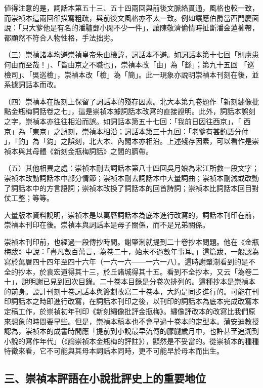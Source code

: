 値得注意的是，詞話本第五十三、五十四兩回與前後文脈絡貫通，風格也較一致，而崇禎本這兩回卻描寫粗疏，與前後文風格亦不太一致。例如讓應伯爵當西門慶面說：「只大爹他是有名的潘驢鄧小閑不少一件」，讓陳敬濟偷情時扯斷潘金蓮褲帶，都顯然不符合人物性格，手法拙劣。

（三）崇禎諸本均避崇禎皇帝朱由檢諱，詞話本不避。如詞話本第十七回「則虜患何由而至哉！」、「皆由京之不職也」，崇禎本改「由」為「繇」；第九十五回 「巡檢司」、「吳巡檢」，崇禎本改「檢」為「簡」。此一現象亦說明崇禎本刊刻在後，並系據詞話本而改。

（四）崇禎本在版刻上保留了詞話本的殘存因素。北大本第九卷題作「新刻繡像批點金瓶梅詞話卷之七」，這是崇禎本據詞話本改寫的直接證明。此外，詞話本誤刻之字，崇禎本亦往往相沿而誤。如詞話本第五十七回：「我前日因往西京」，「 西京」為「東京」之誤刻，崇禎本相沿；詞話本第三十九回：「老爹有甚釣語分付 」，「釣」為「鈞」之誤刻，北大本、內閣本亦相沿。上述殘存因素，可以看作是崇禎本與其母體《新刻金瓶梅詞話》之間的臍帶。

（五）其他相異之處：崇禎本刪去詞話本第八十四回吳月娘為宋江所救一段文字；崇禎本改動詞話本中部分情節；崇禎本刪去詞話本中大量詞曲；崇禎本刪減或改動了詞話本中的方言語詞；崇禎本改換了詞話本的回首詩詞；崇禎本比詞話本回目對仗工整；等等。

大量版本資料說明，崇禎本是以萬曆詞話本為底本進行改寫的，詞話本刊印在前，崇禎本刊印在後。崇禎本與詞話本是母子關係，而不是兄弟關係。

崇禎本刊印前，也經過一段傳抄時間。謝肇淛就提到二十卷抄本問題。他在《金瓶梅跋》中說：「書凡數百萬言，為卷二十，始末不過數年事耳。」這篇跋，一般認為寫於萬曆四十四年至四十六年（一六一六——一六一八）。這時謝肇淛看到的是不全的抄本，於袁宏道得其十三，於丘諸城得其十五。看到不全抄本，又云「為卷二十」，說明謝已見到回次目錄。二十卷本目錄是分卷次排列的。這種抄本是崇禎本的前身。設計刊刻十卷詞話本與籌劃改寫二十卷本，大約是同步進行的。可能在刊印詞話本之時即進行改寫，在詞話本刊印之後，以刊印的詞話本為底本完成改寫本定稿工作，於崇禎初年刊印《新刻繡像批評金瓶梅》。繡像評改本的改寫比我們原來想象的時間要早些。但是，崇禎本稿本也不會早過十卷本的定型本。蒲安迪教授認為，崇禎本的成書時間應「提前到小說最早流傳的朦朧歲月中，也許甚至追溯到小說的寫作年代」（《論崇禎本金瓶梅的評註》），顯然是不妥當的。從崇禎本的種種特徵來看，它不可能與其母本詞話本同時，更不可能早於母本而出生。

\subsection*{三、崇禎本評語在小說批評史上的重要地位}

